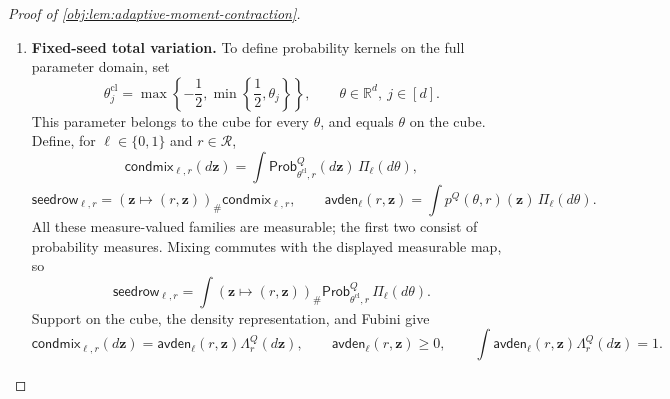 \documentclass[11pt]{article}
\begin{document}
\begin{proof}[Proof of \cref{obj:lem:adaptive-moment-contraction}]
\begin{enumerate}
For \(v<d\), set \(j=v+1\). Resampling coordinate \(j\) from \(\nu_0\) preserves \(\Pi_v^{\mathrm{hyb}}\); resampling it from \(\nu_1\) gives \(\Pi_{v+1}^{\mathrm{hyb}}\). Explicitly, with \(\#\) denoting pushforward,
\[
(\theta,u\mapsto\theta^{[j:u]})_\#
 (\Pi_v^{\mathrm{hyb}}\otimes\nu_0)=\Pi_v^{\mathrm{hyb}},
\qquad
(\theta,u\mapsto\theta^{[j:u]})_\#
 (\Pi_v^{\mathrm{hyb}}\otimes\nu_1)=\Pi_{v+1}^{\mathrm{hyb}}.
\]
Fubini therefore gives
\[
\mathsf{avg}_v^r(\mathbf z)-\mathsf{avg}_{v+1}^r(\mathbf z)
=
\int\mathsf{diff}^{\theta,r}_j(\mathbf z)\,
 \Pi_v^{\mathrm{hyb}}(d\theta).
\]
The triangle inequality under the integral, followed by the single-coordinate estimate, yields
\[
\begin{split}
\int
 |\mathsf{avg}_v^r-\mathsf{avg}_{v+1}^r|\,d\Lambda_r^Q
&\le
\int
 \left\{\int|\mathsf{diff}^{\theta,r}_j(\mathbf z)|
              \Lambda_r^Q(d\mathbf z)\right\}
 \Pi_v^{\mathrm{hyb}}(d\theta)\\
&\le2\alpha^k\sqrt{\binom nk}\,\beta^k.
\end{split}
\]
Telescoping the \(d\) replacements now gives
\[
\begin{split}
&\int
 \left|
 \int p^Q(\theta,r)(\mathbf z)\,\Pi_0(d\theta)
 -\int p^Q(\theta,r)(\mathbf z)\,\Pi_1(d\theta)
 \right|
 \Lambda_r^Q(d\mathbf z)\\
&\qquad
=\int|\mathsf{avg}_0^r-\mathsf{avg}_d^r|\,d\Lambda_r^Q\\
&\qquad
\le\sum_{v=0}^{d-1}
 \int|\mathsf{avg}_v^r-\mathsf{avg}_{v+1}^r|\,d\Lambda_r^Q\\
&\qquad
\le2d\alpha^k\sqrt{\binom nk}\,\beta^k.
\end{split}
\]

\item \textbf{Fixed-seed total variation.}
To define probability kernels on the full parameter domain, set
\[
\theta^{\mathrm{cl}}_j
=\max\left\{-\frac12,\min\left\{\frac12,\theta_j\right\}\right\},
\qquad
\theta\in\mathbb R^d,\ j\in[d].
\]
This parameter belongs to the cube for every \(\theta\), and equals \(\theta\) on the cube. Define, for \(\ell\in\{0,1\}\) and \(r\in\mathcal R\),
\[
\mathsf{condmix}_{\ell,r}(d\mathbf z)
=\int\mathsf{Prob}^Q_{\theta^{\mathrm{cl}},r}(d\mathbf z)\,
 \Pi_\ell(d\theta),
\]
\[
\mathsf{seedrow}_{\ell,r}
=(\mathbf z\mapsto(r,\mathbf z))_\#
 \mathsf{condmix}_{\ell,r},
\qquad
\mathsf{avden}_\ell(r,\mathbf z)
=\int p^Q(\theta,r)(\mathbf z)\,\Pi_\ell(d\theta).
\]
All these measure-valued families are measurable; the first two consist of probability measures. Mixing commutes with the displayed measurable map, so
\[
\mathsf{seedrow}_{\ell,r}
=
\int
 (\mathbf z\mapsto(r,\mathbf z))_\#
 \mathsf{Prob}^Q_{\theta^{\mathrm{cl}},r}\,
 \Pi_\ell(d\theta).
\]
Support on the cube, the density representation, and Fubini give
\[
\mathsf{condmix}_{\ell,r}(d\mathbf z)
=\mathsf{avden}_\ell(r,\mathbf z)\Lambda_r^Q(d\mathbf z),
\qquad
\mathsf{avden}_\ell(r,\mathbf z)\ge0,
\qquad
\int\mathsf{avden}_\ell(r,\mathbf z)\Lambda_r^Q(d\mathbf z)=1.
\]


\end{enumerate}
\end{proof}
\end{document}
